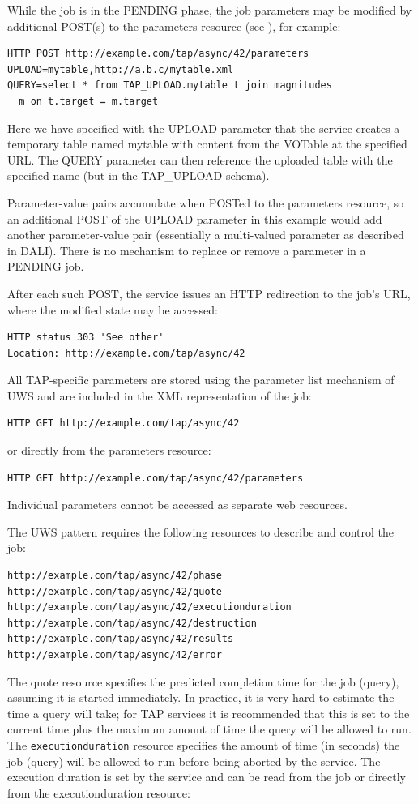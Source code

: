 \documentclass[11pt,letter]{ivoa}
\newcommand{\tapupload}{TAP\_UPLOAD}
\newcommand{\tapupload}{%
  {\relsize{-0.5}TAP\discretionary{-}{}{\kern-2pt\_}UPLOAD}}
\begin{document}
While the job is in the PENDING phase, the job parameters may be modified 
by additional POST(s) to the parameters resource (see 
\citet{2017ivoa.spec.0517D}), for example:

\begin{verbatim}
HTTP POST http://example.com/tap/async/42/parameters
UPLOAD=mytable,http://a.b.c/mytable.xml
QUERY=select * from TAP_UPLOAD.mytable t join magnitudes 
  m on t.target = m.target
\end{verbatim}

Here we have specified with the UPLOAD parameter that the service creates a 
temporary table named mytable with content from the VOTable at the specified 
URL. The QUERY parameter can then reference the uploaded table with the 
specified name (but in the \tapupload{} schema).

Parameter-value pairs accumulate when POSTed to the parameters resource, so an 
additional POST of the UPLOAD parameter in this example would add another 
parameter-value pair (essentially a multi-valued parameter as described in 
DALI). There is no mechanism to replace or remove a parameter in a 
PENDING job.

After each such POST, the service issues an HTTP redirection to the job's URL, 
where the modified state may be accessed:

\begin{verbatim}
HTTP status 303 'See other'
Location: http://example.com/tap/async/42
\end{verbatim}

All TAP-specific parameters are stored using the parameter list mechanism of 
UWS and are included in the XML representation of the job:
\begin{verbatim}
HTTP GET http://example.com/tap/async/42
\end{verbatim}
or directly from the parameters resource:
\begin{verbatim}
HTTP GET http://example.com/tap/async/42/parameters
\end{verbatim}
Individual parameters cannot be accessed as separate web resources.

The UWS pattern requires the following resources to describe and control the 
job:
\begin{verbatim}
http://example.com/tap/async/42/phase
http://example.com/tap/async/42/quote
http://example.com/tap/async/42/executionduration
http://example.com/tap/async/42/destruction
http://example.com/tap/async/42/results
http://example.com/tap/async/42/error
\end{verbatim}
The quote resource specifies the predicted completion time for the job (query), 
assuming it is started immediately. In practice, it is very hard to estimate the 
time a query will take; for TAP services it is recommended that this is set to 
the current time plus the maximum amount of time the query will be allowed to 
run. The \verb|executionduration| resource specifies the amount of time (in seconds) 
the job (query) will be allowed to run before being aborted by the service. The 
execution duration is set by the service and can be read from the job or 
directly from the executionduration resource:
\end{document}
